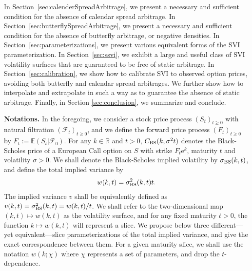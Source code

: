 \documentclass[12pt]{article}
\numberwithin{equation}{section}
\newcommand{\Ex}{\mathrm{e}}
\newcommand{\BS}{\rm BS}
\begin{document}
In Section~\ref{sec:calenderSpreadArbitrage}, we present a necessary and sufficient condition for the absence of calendar spread arbitrage.
In Section~\ref{sec:butterflySpreadArbitrage}, we present a necessary and sufficient condition for the absence of butterfly arbitrage, or negative densities.
In Section~\ref{sec:parameterizations}, we present various equivalent forms of the SVI parameterization.
In Section~\ref{sec:ssvi}, we exhibit a large and useful class of SVI volatility surfaces that are guaranteed to be free of static arbitrage.
In Section~\ref{sec:calibration}, we show how to calibrate SVI to observed option prices, avoiding both butterfly and calendar spread arbitrages.  We further show how to interpolate and extrapolate in such a way as to guarantee the absence of static arbitrage.
Finally, in Section \ref{sec:conclusion}, we summarize and conclude.



\textbf{Notations.}
In the foregoing, we consider a stock price process $\left(S_t\right)_{t\geq 0}$
with natural filtration $\left(\mathcal{F}_t\right)_{t\geq 0}$, and we define the forward price process $\left(F_t\right)_{t\geq 0}$
by $F_t:=\mathbb{E}\left(S_t|\mathcal{F}_0\right)$.
For any $k\in\mathbb{R}$ and $t>0$,
$C_{\BS}(k,\sigma^2 t)$ denotes the Black-Scholes price of a European Call option on $S$ with strike $F_t \Ex^{k}$,
maturity $t$ and volatility $\sigma>0$.
We shall denote the Black-Scholes implied volatility by $\sigma_{\BS}(k,t)$, and define the total implied variance by
$$
w(k,t)=\sigma_{\BS}^2(k,t)t.
$$
The implied variance $v$ shall be equivalently defined as $v(k,t)=\sigma_{\BS}^2(k,t)=w(k,t)/t$.
We shall refer to the two-dimensional map $(k,t)\mapsto w(k,t)$ as the volatility surface,
and for any fixed maturity $t>0$, the function $k\mapsto w(k,t)$ will represent a slice.
We propose below three different---yet equivalent---slice parameterizations of the total implied variance,
and give the exact correspondence between them.
For a given maturity slice, we shall use the notation $w(k;\chi)$ where $\chi$ represents a set of parameters, and drop the $t$-dependence.


\end{document}

